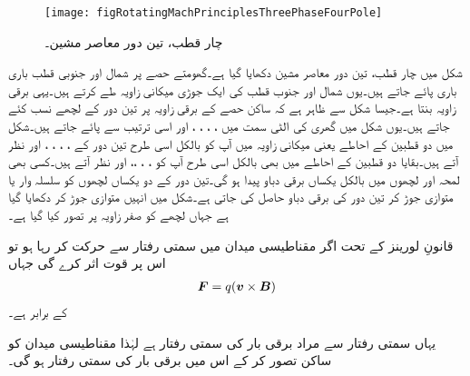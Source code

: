 \begin{figure}
\centering
\texttt{[image: figRotatingMachPrinciplesThreePhaseFourPole]}
\caption{چار قطب، تین دور معاصر مشین۔}
\label{شکل_گھومتے_مشین_چار_قطب_تین_دور_معاصر}
\end{figure}
شکل  میں چار قطب، تین دور معاصر مشین دکھایا گیا ہے۔گھومتے حصے پر شمال اور جنوبی قطب باری باری پائے جاتے ہیں۔یوں شمال اور جنوب قطب کی ایک جوڑی  میکانی زاویہ طے کرتے ہیں۔یہی  برقی زاویہ بنتا ہے۔جیسا شکل  سے ظاہر ہے کہ ساکن حصے کے  برقی زاویہ پر تین دور کے لچھے نسب کئے جاتے ہیں۔یوں شکل  میں گھری کی الٹی سمت میں  ، ، ، ،  اور  اسی ترتیب سے پائے جاتے ہیں۔شکل  میں  دو قطبین کے احاطے یعنی  میکانی زاویہ میں آپ کو بالکل اسی طرح تین دور کے  ، ، ، ،  اور  نظر آتے ہیں۔بقایا دو قطبین کے احاطے میں بھی بالکل اسی طرح آپ کو ، ، ،،  اور  نظر آتے ہیں۔کسی بھی لمحہ  اور  لچھوں میں بالکل یکساں برقی دباو پیدا ہو گی۔تین دور کے دو یکساں لچھوں کو سلسلہ وار یا متوازی جوڑ کر تین دور کی برقی دباو حاصل کی جاتی ہے۔شکل میں انہیں متوازی جوڑ کر دکھایا گیا ہے جہاں  لچھے کو صفر زاویہ پر تصور کیا گیا ہے۔    


قانونِ لورینز کے تحت اگر    مقناطیسی میدان  میں سمتی رفتار  سے حرکت کر رہا ہو تو اس پر قوت   اثر کرے گی  جہاں
\begin{align}\label{مساوات_گھومتے_مشین_قوت_لورینز}
{\ensuremath{{\boldsymbol{F}}}}=q ({{\boldsymbol{v}}} \times {\ensuremath{{\boldsymbol{B}}}})
\end{align}
کے برابر ہے۔

یہاں سمتی رفتار سے مراد برقی بار کی سمتی رفتار ہے لہٰذا مقناطیسی میدان کو ساکن تصور کر کے اس میں برقی بار کی سمتی رفتار  ہو گی۔

